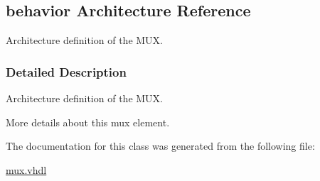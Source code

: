 \hypertarget{classmux__using__with_1_1behavior}{}\subsection{behavior Architecture Reference}
\label{classmux__using__with_1_1behavior}


Architecture definition of the M\+UX.  




\subsubsection{Detailed Description}
Architecture definition of the M\+UX. 

More details about this mux element. 

The documentation for this class was generated from the following file\+:\begin{DoxyCompactItemize}
\item 
\mbox{\hyperlink{mux_8vhdl}{mux.\+vhdl}}\end{DoxyCompactItemize}
